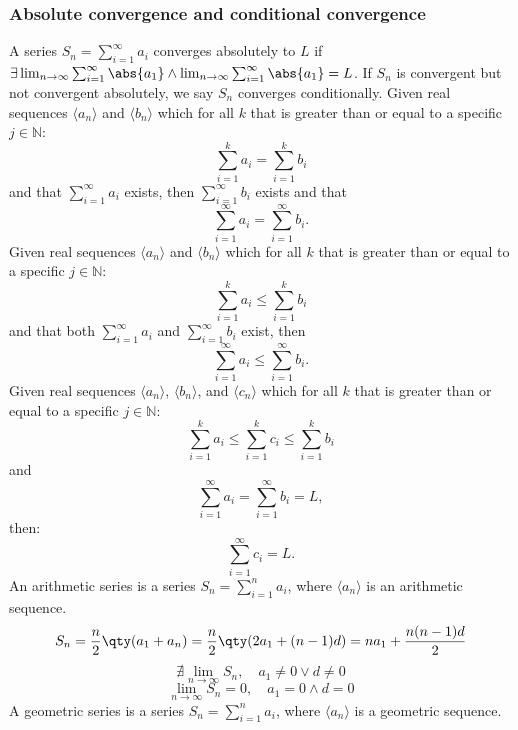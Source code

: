 \documentclass[a4paper,12pt]{report}
\begin{document}
\subsubsection{Absolute convergence and conditional convergence}
A series $S_n=\sum_{i=1}^{\infty}a_i$ converges absolutely to $L$ if $\exists\lim_{n\to\infty}\sum_{i=1}^{\infty}\abs{a_1}\land\lim_{n\to\infty}\sum_{i=1}^{\infty}\abs{a_1}=L$. If $S_n$ is convergent but not convergent absolutely, we say $S_n$ converges conditionally.
Given real sequences $\langle a_n\rangle$ and $\langle b_n\rangle$ which for all $k$ that is greater than or equal to a specific $j\in \mathbb{N}$:
\[\sum_{i=1}^ka_i=\sum_{i=1}^kb_i\]
and that $\sum_{i=1}^{\infty}a_i$ exists, then $\sum_{i=1}^{\infty}b_i$ exists and that
\[\sum_{i=1}^{\infty}a_i=\sum_{i=1}^{\infty}b_i.\]
Given real sequences $\langle a_n\rangle$ and $\langle b_n\rangle$ which for all $k$ that is greater than or equal to a specific $j\in \mathbb{N}$:
\[\sum_{i=1}^ka_i\leq\sum_{i=1}^kb_i\]
and that both $\sum_{i=1}^{\infty}a_i$ and $\sum_{i=1}^{\infty}b_i$ exist, then
\[\sum_{i=1}^{\infty}a_i\leq\sum_{i=1}^{\infty}b_i.\]
Given real sequences $\langle a_n\rangle$, $\langle b_n\rangle$, and $\langle c_n\rangle$ which for all $k$ that is greater than or equal to a specific $j\in \mathbb{N}$:
\[\sum_{i=1}^ka_i\leq\sum_{i=1}^kc_i\leq\sum_{i=1}^kb_i\]
and
\[\sum_{i=1}^{\infty}a_i=\sum_{i=1}^{\infty}b_i=L,\]
then: 
\[\sum_{i=1}^{\infty}c_i=L.\]
An arithmetic series is a series $S_n=\sum_{i=1}^na_i$, where $\langle a_n\rangle$ is an arithmetic sequence.
\[S_n=\frac{n}{2}\qty(a_1+a_n)=\frac{n}{2}\qty(2a_1+(n-1)d)=na_1+\frac{n(n-1)d}{2}\]
\[\nexists\lim_{n\to\infty}S_n,\quad a_1\neq 0\lor d\neq 0\]
\[\lim_{n\to\infty}S_n=0,\quad a_1=0\land d=0\]
A geometric series is a series $S_n=\sum_{i=1}^na_i$, where $\langle a_n\rangle$ is a geometric sequence.
\end{document}
